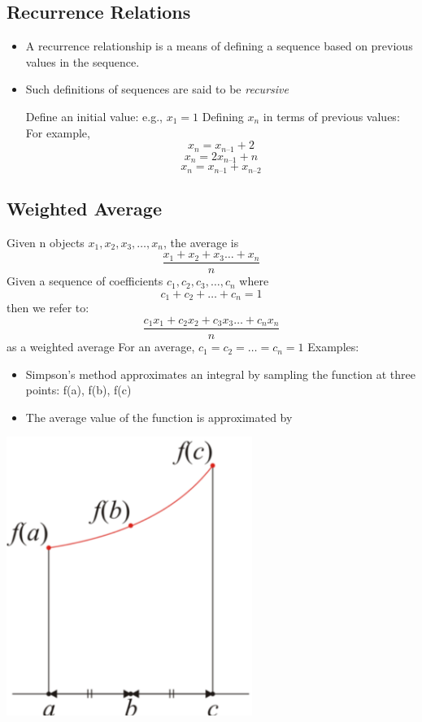 \documentclass[11pt]{article}
\theoremstyle{definition}
\begin{document}
\newpage
\subsection{Recurrence Relations}
\begin{itemize}[label={--}]
\item A recurrence relationship is a means of defining a sequence based on previous values in the sequence.
\item Such definitions of sequences are said to be \textit{recursive}
\begin{shaded}
Define an initial value: e.g., $x_1 = 1$
\newline
Defining $x_n$ in terms of previous values:
For example,
	  		$$x_n = x_{n – 1} + 2$$
			$$x_n = 2x_{n – 1} + n$$
			$$x_n = x_{n – 1} + x_{n – 2}$$
\end{shaded}
\end{itemize}
\subsection{Weighted Average}
Given n objects $x_1, x_2, x_3, \ldots, x_n$, the average is
$$\frac{x_1+x_2+x_3\ldots+x_n}{n}$$
	Given a sequence of coefficients $c_1 , c_2 , c_3 ,\ldots, c_n$ where
$$c_1 + c_2 + \ldots + c_n = 1$$
then we refer to:
$$\frac{c_1x_1+c_2x_2+c_3x_3\ldots+c_nx_n}{n}$$	as a weighted average \newline
For an average, $c_1 = c_2 = \ldots = c_n = 1$
\newline
Examples:
\newline
\begin{minipage}{0.4\textwidth}
\begin{itemize}[label={--}]
\item Simpson’s method approximates an integral by sampling the function at three points:  f(a), f(b), f(c)
\item The average value of the function is approximated by
\end{itemize}
\end{minipage}%
%
\begin{minipage}{0.4\textwidth}
\begin{center}
    \includegraphics[width=0.6\textwidth]{simmons}
    \label{img:g}
\end{center}
\end{minipage}
\end{document}
